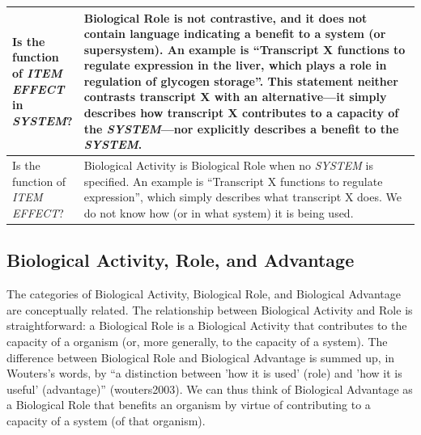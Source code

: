 \documentclass{article}
\begin{document}
\begin{landscape}
\begin{table}
\begin{tabular}{|p{0.17\linewidth}|p{0.97\linewidth}|}
    \hline
    Is the function of \emph{ITEM} \emph{EFFECT} in \emph{SYSTEM}? &  Biological Role is not contrastive, and it does not contain language indicating a benefit to a system (or supersystem). An example is ``Transcript X functions to regulate expression in the liver, which plays a role in regulation of glycogen storage''. This statement neither contrasts transcript X with an alternative---it simply describes how transcript X contributes to a capacity of the \emph{SYSTEM}---nor explicitly describes a benefit to the \emph{SYSTEM}.  \\
    \hline
    Is the function of \emph{ITEM} \emph{EFFECT}? &  Biological Activity is Biological Role when no \emph{SYSTEM} is specified. An example is ``Transcript X functions to regulate expression'', which simply describes what transcript X does. We do not know how (or in what system) it is being used. \\
    \hline
  \end{tabular}
  \label{tab:flowchart}
\end{table}
\end{landscape}

\subsection{Biological Activity, Role, and Advantage}
\label{sec:relat-betw-funct}

The categories of Biological Activity, Biological Role, and Biological Advantage are conceptually related.
The relationship between Biological Activity and Role is straightforward: a Biological Role is a Biological Activity that contributes to the capacity of a organism (or, more generally, to the capacity of a system). 
The difference between Biological Role and Biological Advantage is summed up, in Wouters's words, by ``a distinction between 'how it is used' (role) and 'how it is useful' (advantage)'' (wouters2003).
We can thus think of Biological Advantage as a Biological Role that benefits an organism by virtue of contributing to a capacity of a system (of that organism).
\end{document}
